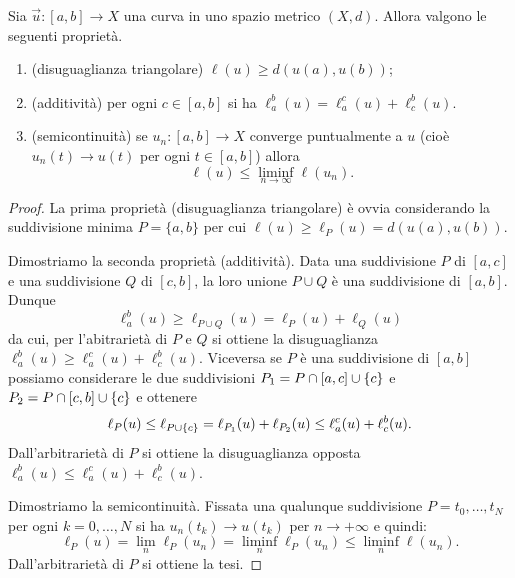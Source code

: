 \begin{theorem}
Sia $\vec u \colon [a,b] \to X$ una curva in uno spazio metrico $(X,d)$.
Allora valgono le seguenti proprietà.
\begin{enumerate}
\item (disuguaglianza triangolare) $\ell(u) \ge d(u(a), u(b))$;
\item (additività) per ogni $c\in [a,b]$ si ha 
  $\ell_a^b(u) = \ell_a^c(u) + \ell_c^b(u)$.
\item (semicontinuità)
se $u_n\colon [a,b] \to X$ converge puntualmente a $u$
(cioè $u_n(t) \to u(t)$ per ogni $t\in[a,b]$)
allora 
\[
  \ell(u) \le \liminf_{n\to \infty} \ell(u_n).
\]
\end{enumerate}
\end{theorem}
\begin{proof}
La prima proprietà (disuguaglianza triangolare) è ovvia 
considerando la suddivisione minima $P = \{ a,b\}$ 
per cui $\ell(u) \ge \ell_P(u) = d(u(a), u(b))$.

Dimostriamo la seconda proprietà (additività).
Data una suddivisione $P$ di $[a,c]$ e una suddivisione $Q$ di $[c,b]$,
la loro unione $P\cup Q$ è una suddivisione di $[a,b]$. Dunque 
\[
    \ell_a^b(u) \ge \ell_{P\cup Q}(u) = \ell_{P}(u) + \ell_{Q}(u)
\] 
da cui, per l'abitrarietà di $P$ e $Q$ si ottiene 
la disuguaglianza $\ell_a^b(u) \ge \ell_a^c(u) + \ell_c^b(u)$.
Viceversa se $P$ è una suddivisione di $[a,b]$ possiamo 
considerare le due suddivisioni $P_1 = P \cap [a,c] \cup {\left\{ c \right\}}$ e
$P_2 = P \cap [c,b] \cup {\left\{ c \right\}}$ 
e ottenere 
\[
\ell_P(u) \le \ell_{P\cup{\left\{ c \right\}}} 
= \ell_{P_1}(u) + \ell_{P_2}(u) 
\le \ell_a^c(u) + \ell_c^b(u).
\]
Dall'arbitrarietà di $P$ si ottiene la disuguaglianza opposta
$\ell_a^b(u) \le \ell_a^c(u) + \ell_c^b(u)$.

Dimostriamo la semicontinuità.
Fissata una qualunque suddivisione $P={t_0,\dots, t_N}$
per ogni $k=0,\dots, N$ si ha $u_n(t_k)\to u(t_k)$ per $n\to +\infty$ e quindi:
\[
  \ell_P(u) =
  \lim_n \ell_P(u_n)
  = \liminf_n \ell_P(u_n)
  \le \liminf_n \ell(u_n).
\]
Dall'arbitrarietà di $P$ si ottiene la tesi.
\end{proof}

